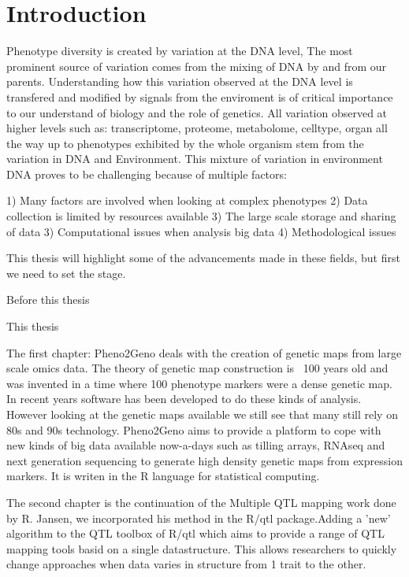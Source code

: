 \chapter{Introduction}
Phenotype diversity is created by variation at the DNA level, The most prominent source of variation comes 
from the mixing of DNA by and from our parents. Understanding how this variation observed at the DNA level 
is transfered and modified by signals from the enviroment is of critical importance to our understand of 
biology and the role of genetics. All variation observed at higher levels such as: transcriptome, proteome, 
metabolome, celltype, organ all the way up to phenotypes exhibited by the whole organism stem from the 
variation in DNA and Environment. This mixture of variation in environment DNA proves to be challenging 
because of multiple factors:

1) Many factors are involved when looking at complex phenotypes
2) Data collection is limited by resources available
3) The large scale storage and sharing of data
3) Computational issues when analysis big data
4) Methodological issues

This thesis will highlight some of the advancements made in these fields, but first we need to set the stage.

Before this thesis


This thesis

The first chapter: Pheno2Geno deals with the creation of genetic maps from large scale omics data. The theory 
of genetic map construction is ~100 years old and was invented in a time where 100 phenotype markers were a 
dense genetic map. In recent years software has been developed to do these kinds of analysis. However looking 
at the genetic maps available we still see that many still rely on 80s and 90s technology. Pheno2Geno aims to 
provide a platform to cope with new kinds of big data available now-a-days such as tilling arrays, RNAseq and 
next generation sequencing to generate high density genetic maps from expression markers. It is writen in the 
R language for statistical computing.

The second chapter is the continuation of the Multiple QTL mapping work done by R. Jansen, we incorporated his 
method in the R/qtl package.Adding a 'new' algorithm to the QTL toolbox of R/qtl which aims to provide a range 
of QTL mapping tools basid on a single datastructure. This allows researchers to quickly change approaches when 
data varies in structure from 1 trait to the other.

